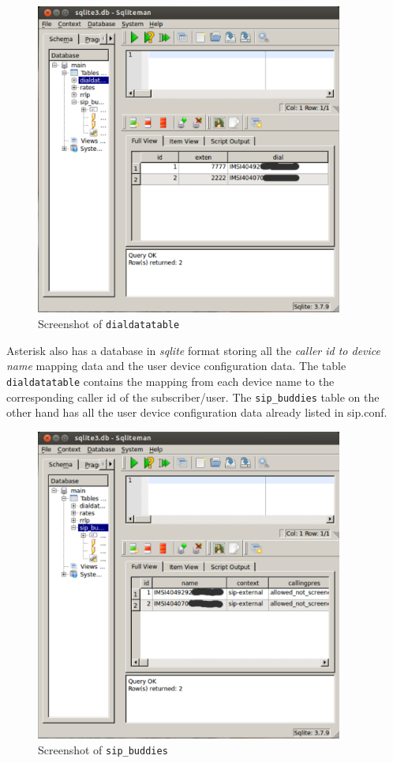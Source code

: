\begin{figure}[t]
  \centering
    \includegraphics[width=0.9\textwidth]{../images/dialdata}
  \caption[Screenshot - dialdatatable]{Screenshot of \texttt{dialdatatable}}
  \label{dialdata}
\end{figure}

Asterisk also has a database in \textsl{sqlite} format storing all the 
\emph{caller id to device name} mapping data and the user device configuration
data. The table \texttt{dialdatatable} contains the mapping from each device
name to the corresponding caller id of the subscriber/user. The
\texttt{sip\_buddies} table on the other hand has all the user device 
configuration data already listed in \textsf{sip.conf}.

\begin{figure}[t]
  \centering
    \includegraphics[width=0.9\textwidth]{../images/sipbuddies}
  \caption[Screenshot - sip\_buddies]{Screenshot of \texttt{sip\_buddies}}
  \label{sipbuddies}
\end{figure}


